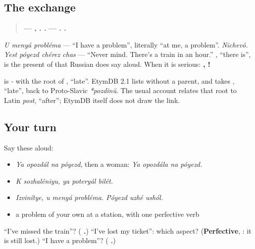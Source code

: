 \subsection*{The exchange}
\begin{quote}
\textbf{— ,   .    .} \textbf{— .    .}
\end{quote}

\emph{U menyá probléma} — \textquotedblleft{}I have a problem\textquotedblright{}, literally \textquotedblleft{}at me, a problem\textquotedblright{}. \emph{Nichevó. Yest póyezd chérez chas} — \textquotedblleft{}Never mind. There's a train in an hour.\textquotedblright{} \textbf{}, \textquotedblleft{}there is\textquotedblright{}, is the present of \emph{} that Russian does say aloud. When it is serious: \textbf{, !}

\begin{cousinweb}
\textbf{} is \emph{-} with the root of \textbf{}, \textquotedblleft{}late\textquotedblright{}. EtymDB 2.1 lists \emph{} without a parent, and takes \emph{}, \textquotedblleft{}late\textquotedblright{}, back to Proto-Slavic \emph{*pozdĭnŭ}. The usual account relates that root to Latin \emph{post}, \textquotedblleft{}after\textquotedblright{}; EtymDB itself does not draw the link.
\end{cousinweb}

\subsection*{Your turn}
Say these aloud:

\begin{itemize}
\raggedright
  \item \emph{Ya opozdál na póyezd}, then a woman: \emph{Ya opozdála na póyezd.}
  \item \emph{K sozhaléniyu, ya poteryál bilét.}
  \item \emph{Izvinítye, u menyá probléma. Póyezd uzhé ushól.}
  \item a problem of your own at a station, with one perfective verb
\end{itemize}

\begin{tcolorbox}[breakable,colback=teal!4,colframe=teal!35!black,title={Before you move on}]
\textquotedblleft{}I've missed the train\textquotedblright{}? (\emph{\textbf{   .}}) \textquotedblleft{}I've lost my ticket\textquotedblright{}: which aspect? (\textbf{Perfective}, \emph{\textbf{}}: it is still lost.) \textquotedblleft{}I have a problem\textquotedblright{}? (\emph{\textbf{  .}})
\end{tcolorbox}
